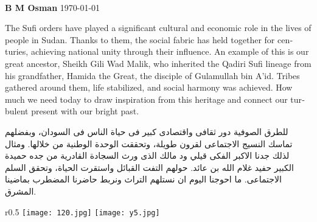 \documentclass[12pt]{article}
\begin{document}
\begin{english}
\begin{center}
{\Huge\textbf{\textcolor{titleColor}}} \\
    \textbf{\textcolor{emphasisColor}{B M Osman}} 
    \vspace{0.2cm}
    \today
\end{center}

The Sufi orders have played a significant cultural and economic role in the lives of people in Sudan. Thanks to them, the social fabric has held together for centuries, achieving national unity through their influence. An example of this is our great ancestor, Sheikh Gili Wad Malik, who inherited the Qadiri Sufi lineage from his grandfather, Hamida the Great, the disciple of Gulamullah bin A'id. Tribes gathered around them, life stabilized, and social harmony was achieved. How much we need today to draw inspiration from this heritage and connect our turbulent present with our bright past.

\end{english}

\vspace{.2cm}

\begin{arabtext}
{ \hspace{.1cm} للطرق الصوفية دور ثقافى واقتصادى كبير فى حياة الناس فى السودان، وبفضلهم تماسك النسيج الاجتماعى لقرون طويلة، وتحققت الوحدة الوطنية من خلالها. ومثال لذلك جدنا الاكبر الفكى قيلي ود مالك الذى ورث السجادة القادرية من جده حميدة الكبير حفيد غلام الله بن عائد. حولهم التفت القبائل واستقرت الحياة، وتحقق السلم الاجتماعى. ما احوجنا اليوم ان نستلهم التراث ونربط حاضرنا المضطرب بماضينا المشرق.}
\end{arabtext}
\begin{wrapfigure}{r}{0.5\textwidth}
\texttt{[image: 120.jpg]}
\texttt{[image: y5.jpg]}
\end{wrapfigure}
\end{document}
